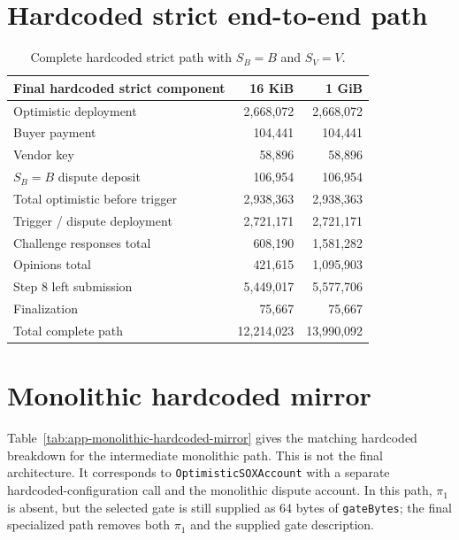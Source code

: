 \section{Hardcoded strict end-to-end path}

\begin{table}[htbp]
  \centering
  \small
  \begin{tabularx}{\linewidth}{>{\raggedright\arraybackslash}Xrr}
    \toprule
    Final hardcoded strict component & 16 KiB & 1 GiB \\
    \midrule
    Optimistic deployment & 2,668,072 & 2,668,072 \\
    Buyer payment & 104,441 & 104,441 \\
    Vendor key & 58,896 & 58,896 \\
    \(S_B=B\) dispute deposit & 106,954 & 106,954 \\
    Total optimistic before trigger & 2,938,363 & 2,938,363 \\
    Trigger / dispute deployment & 2,721,171 & 2,721,171 \\
    Challenge responses total & 608,190 & 1,581,282 \\
    Opinions total & 421,615 & 1,095,903 \\
    Step 8 left submission & 5,449,017 & 5,577,706 \\
    Finalization & 75,667 & 75,667 \\
    \midrule
    Total complete path & 12,214,023 & 13,990,092 \\
    \bottomrule
  \end{tabularx}
  \caption{Complete hardcoded strict path with \(S_B=B\) and \(S_V=V\).}
  \label{tab:app-hardcoded-strict}
\end{table}

\section{Monolithic hardcoded mirror}

Table~\ref{tab:app-monolithic-hardcoded-mirror} gives the matching hardcoded breakdown for
the intermediate monolithic path. This is not the final architecture. It corresponds to
\texttt{OptimisticSOXAccount} with a separate hardcoded-configuration call and the
monolithic dispute account. In this
path, \(\pi_1\) is absent, but the selected gate is still supplied as 64 bytes of
\texttt{gateBytes}; the final specialized path removes both \(\pi_1\) and the supplied gate
description.

